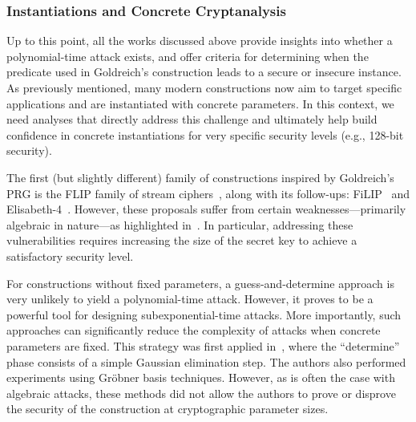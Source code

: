 \documentclass[journal=tosc,submission]{iacrtrans}
\theoremstyle{theorem}
\begin{document}


\subsubsection{Instantiations and Concrete Cryptanalysis}

Up to this point, all the works discussed above provide insights into whether a polynomial-time attack exists, and offer criteria for determining when the predicate used in Goldreich's construction leads to a secure or insecure instance. As previously mentioned, many modern constructions now aim to target specific applications and are instantiated with concrete parameters. In this context, we need analyses that directly address this challenge and ultimately help build confidence in concrete instantiations for very specific security levels (e.g., 128-bit security).

The first (but slightly different) family of constructions inspired by Goldreich's PRG is the {\sf FLIP} family of stream ciphers~\cite{EC:MJSC16}, along with its follow-ups: {\sf FiLIP}~\cite{INDOCRYPT:MCJS19, INDOCRYPT:HofMeaRic20} and {\sf Elisabeth-4}~\cite{INDOCRYPT:HofMeaSta23}. However, these proposals suffer from certain weaknesses—primarily algebraic in nature—as highlighted in~\cite{C:DuvLalRot16, AC:GBJR23}. In particular, addressing these vulnerabilities requires increasing the size of the secret key to achieve a satisfactory security level.

For constructions without fixed parameters, a guess-and-determine approach is very unlikely to yield a polynomial-time attack. However, it proves to be a powerful tool for designing subexponential-time attacks. More importantly, such approaches can significantly reduce the complexity of attacks when concrete parameters are fixed. This strategy was first applied in~\cite{AC:CDMRR18}, where the “determine” phase consists of a simple Gaussian elimination step. The authors also performed experiments using Gröbner basis techniques. However, as is often the case with algebraic attacks, these methods did not allow the authors to prove or disprove the security of the construction at cryptographic parameter sizes.
\end{document}
